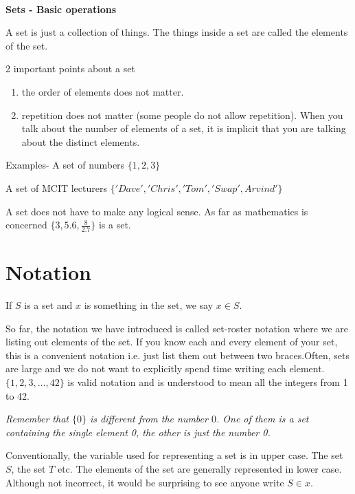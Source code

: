 \documentclass[12pt]{article}
\begin{document}
\begin{center}
\\
\vspace{1cm}
\end{center}


\medskip\noindent
	

{\bf Sets - Basic operations}

A set is just a collection of things. The things inside a set are called the elements of the set.

2 important points about a set

\begin{enumerate}
\item the order of elements does not matter.
\item repetition does not matter (some people do not allow repetition). When you talk about the number of elements of a set, it is implicit that you are talking about the distinct elements.
\end{enumerate}

Examples- 
A set of numbers $\{1,2,3\}$

A set of MCIT lecturers $\{'Dave','Chris', 'Tom', 'Swap', Arvind'\}$

A set does not have to make any logical sense. As far as mathematics is concerned $\{3, 5.6, \frac{8}{2.7}\}$ is a set.

\section*{Notation}

If $S$ is a set and $x$ is something in the set, we say $x \in S$.

So far, the notation we have introduced is called set-roster notation where we are listing out elements of the set. If you know each and every element of your set, this is a convenient notation i.e. just list them out between two braces.Often, sets are large and we do not want to explicitly spend time writing each element. $\{1,2,3,\ldots,42\}$ is valid notation and is understood to mean all the integers from 1 to 42.

\emph{Remember that $\{0\}$ is different from the number $0$. One of them is a set containing the single element 0, the other is just the number 0. }

Conventionally, the variable used for representing a set is in upper case. The set $S$, the set $T$ etc. The elements of the set are generally represented in lower case. Although not incorrect, it would be surprising to see anyone write $S \in x$.  
\end{document}
